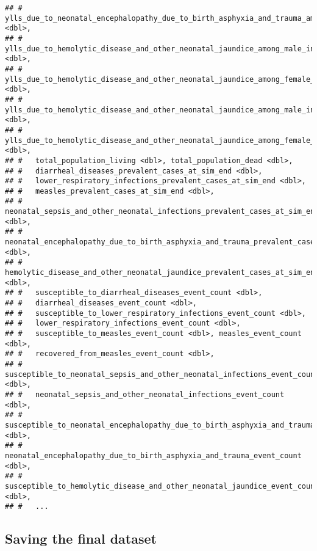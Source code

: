 \documentclass[]{article}
\begin{document}
\begin{verbatim}
## #   ylls_due_to_neonatal_encephalopathy_due_to_birth_asphyxia_and_trauma_among_female_in_age_group_1_to_4 <dbl>,
## #   ylls_due_to_hemolytic_disease_and_other_neonatal_jaundice_among_male_in_age_group_late_neonatal <dbl>,
## #   ylls_due_to_hemolytic_disease_and_other_neonatal_jaundice_among_female_in_age_group_late_neonatal <dbl>,
## #   ylls_due_to_hemolytic_disease_and_other_neonatal_jaundice_among_male_in_age_group_1_to_4 <dbl>,
## #   ylls_due_to_hemolytic_disease_and_other_neonatal_jaundice_among_female_in_age_group_1_to_4 <dbl>,
## #   total_population_living <dbl>, total_population_dead <dbl>,
## #   diarrheal_diseases_prevalent_cases_at_sim_end <dbl>,
## #   lower_respiratory_infections_prevalent_cases_at_sim_end <dbl>,
## #   measles_prevalent_cases_at_sim_end <dbl>,
## #   neonatal_sepsis_and_other_neonatal_infections_prevalent_cases_at_sim_end <dbl>,
## #   neonatal_encephalopathy_due_to_birth_asphyxia_and_trauma_prevalent_cases_at_sim_end <dbl>,
## #   hemolytic_disease_and_other_neonatal_jaundice_prevalent_cases_at_sim_end <dbl>,
## #   susceptible_to_diarrheal_diseases_event_count <dbl>,
## #   diarrheal_diseases_event_count <dbl>,
## #   susceptible_to_lower_respiratory_infections_event_count <dbl>,
## #   lower_respiratory_infections_event_count <dbl>,
## #   susceptible_to_measles_event_count <dbl>, measles_event_count <dbl>,
## #   recovered_from_measles_event_count <dbl>,
## #   susceptible_to_neonatal_sepsis_and_other_neonatal_infections_event_count <dbl>,
## #   neonatal_sepsis_and_other_neonatal_infections_event_count <dbl>,
## #   susceptible_to_neonatal_encephalopathy_due_to_birth_asphyxia_and_trauma_event_count <dbl>,
## #   neonatal_encephalopathy_due_to_birth_asphyxia_and_trauma_event_count <dbl>,
## #   susceptible_to_hemolytic_disease_and_other_neonatal_jaundice_event_count <dbl>,
## #   ...
\end{verbatim}

\hypertarget{saving-the-final-dataset}{%
\subsection{Saving the final dataset}\label{saving-the-final-dataset}}
\end{document}
